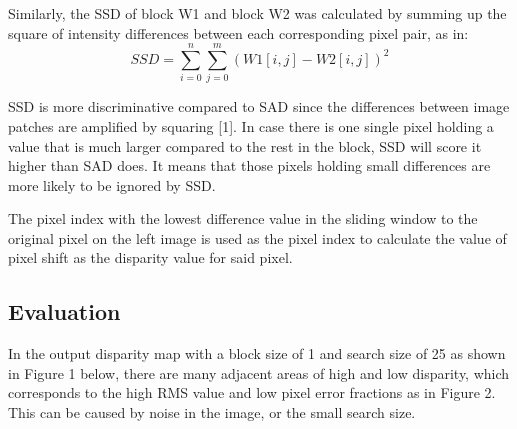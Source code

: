 \documentclass[conference]{IEEEtran}
\begin{document}
Similarly, the SSD of block W1 and block W2 was calculated by summing up the square of intensity differences between each corresponding pixel pair, as in:
\begin{equation*}
    SSD=\sum^{n}_{i=0}\sum^{m}_{j=0}(W1[i,j]-W2[i,j])^2
\end{equation*}

SSD is more discriminative compared to SAD since the differences between image patches are amplified by squaring [1]. In case there is one single pixel holding a value that is much larger compared to the rest in the block, SSD will score it higher than SAD does. It means that those pixels holding small differences are more likely to be ignored by SSD.

The pixel index with the lowest difference value in the sliding window to the original pixel on the left image is used as the pixel index to calculate the value of pixel shift as the disparity value for said pixel.
\subsection{Evaluation}
In the output disparity map with a block size of 1 and search size of 25 as shown in Figure 1 below, there are many adjacent areas of high and low disparity, which corresponds to the high RMS value and low pixel error fractions as in Figure 2. This can be caused by noise in the image, or the small search size.
\end{document}
